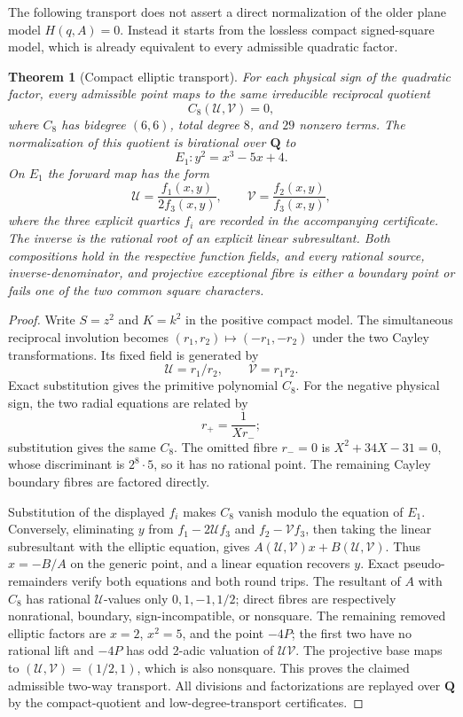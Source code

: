 \documentclass[11pt]{article}
\newtheorem{theorem}{Theorem}
\begin{document}
The following transport does not assert a direct normalization of the older
plane model $H(q,A)=0$.  Instead it starts from the lossless compact
signed-square model, which is already equivalent to every admissible
quadratic factor.

\begin{theorem}[Compact elliptic transport]
For each physical sign of the quadratic factor, every admissible point maps
to the same irreducible reciprocal quotient
\[
 C_8(\mathcal U,\mathcal V)=0,
\]
where $C_8$ has bidegree $(6,6)$, total degree $8$, and $29$ nonzero terms.
The normalization of this quotient is birational over $\mathbf Q$ to
\[
 E_1:y^2=x^3-5x+4.
\]
On $E_1$ the forward map has the form
\[
 \mathcal U=\frac{f_1(x,y)}{2f_3(x,y)},\qquad
 \mathcal V=\frac{f_2(x,y)}{f_3(x,y)},
\]
where the three explicit quartics $f_i$ are recorded in the accompanying
certificate.  The inverse is the rational root of an explicit linear
subresultant.  Both compositions hold in the respective function fields,
and every rational source, inverse-denominator, and projective exceptional
fibre is either a boundary point or fails one of the two common square
characters.
\end{theorem}

\begin{proof}
Write $S=z^2$ and $K=k^2$ in the positive compact model.  The simultaneous
reciprocal involution becomes $(r_1,r_2)\mapsto(-r_1,-r_2)$ under the two
Cayley transformations.  Its fixed field is generated by
\[
 \mathcal U=r_1/r_2,\qquad \mathcal V=r_1r_2.
\]
Exact substitution gives the primitive polynomial $C_8$.  For the negative
physical sign, the two radial equations are related by
\[
 r_+=\frac1{Xr_-};
\]
substitution gives the same $C_8$.  The omitted fibre $r_-=0$ is
$X^2+34X-31=0$, whose discriminant is $2^8\cdot5$, so it has no rational
point.  The remaining Cayley boundary fibres are factored directly.

Substitution of the displayed $f_i$ makes $C_8$ vanish modulo the equation of
$E_1$.  Conversely, eliminating $y$ from
$f_1-2\mathcal U f_3$ and $f_2-\mathcal V f_3$, then taking the linear
subresultant with the elliptic equation, gives $A(\mathcal U,\mathcal V)x+
B(\mathcal U,\mathcal V)$.  Thus $x=-B/A$ on the generic point, and a linear
equation recovers $y$.  Exact pseudo-remainders verify both equations and both
round trips.  The resultant of $A$ with $C_8$ has rational
$\mathcal U$-values only $0,1,-1,1/2$; direct fibres are respectively
nonrational, boundary, sign-incompatible, or nonsquare.  The remaining
removed elliptic factors are $x=2$, $x^2=5$, and the point $-4P$; the first
two have no rational lift and $-4P$ has odd 2-adic valuation of
$\mathcal U\mathcal V$.  The projective base maps to
$(\mathcal U,\mathcal V)=(1/2,1)$, which is also nonsquare.  This proves the
claimed admissible two-way transport.  All divisions and factorizations are
replayed over $\mathbf Q$ by the compact-quotient and low-degree-transport
certificates.
\end{proof}
\end{document}
